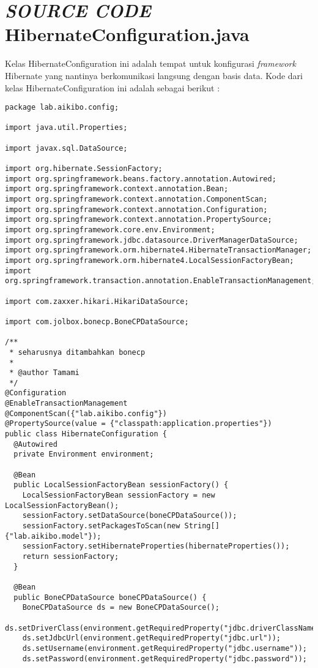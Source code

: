 \documentclass[pdftex,12pt, oneside]{article}
\begin{document}
\section{\textit{SOURCE CODE} HibernateConfiguration.java}

Kelas HibernateConfiguration ini adalah tempat untuk konfigurasi \textit{framework} Hibernate yang nantinya berkomunikasi langsung dengan basis data. Kode dari kelas HibernateConfiguration ini adalah sebagai berikut :

\begin{lstlisting}
package lab.aikibo.config;

import java.util.Properties;

import javax.sql.DataSource;

import org.hibernate.SessionFactory;
import org.springframework.beans.factory.annotation.Autowired;
import org.springframework.context.annotation.Bean;
import org.springframework.context.annotation.ComponentScan;
import org.springframework.context.annotation.Configuration;
import org.springframework.context.annotation.PropertySource;
import org.springframework.core.env.Environment;
import org.springframework.jdbc.datasource.DriverManagerDataSource;
import org.springframework.orm.hibernate4.HibernateTransactionManager;
import org.springframework.orm.hibernate4.LocalSessionFactoryBean;
import org.springframework.transaction.annotation.EnableTransactionManagement;

import com.zaxxer.hikari.HikariDataSource;

import com.jolbox.bonecp.BoneCPDataSource;

/**
 * seharusnya ditambahkan bonecp
 *
 * @author Tamami
 */
@Configuration
@EnableTransactionManagement
@ComponentScan({"lab.aikibo.config"})
@PropertySource(value = {"classpath:application.properties"})
public class HibernateConfiguration {
  @Autowired
  private Environment environment;

  @Bean
  public LocalSessionFactoryBean sessionFactory() {
    LocalSessionFactoryBean sessionFactory = new LocalSessionFactoryBean();
    sessionFactory.setDataSource(boneCPDataSource());
    sessionFactory.setPackagesToScan(new String[] {"lab.aikibo.model"});
    sessionFactory.setHibernateProperties(hibernateProperties());
    return sessionFactory;
  }

  @Bean
  public BoneCPDataSource boneCPDataSource() {
    BoneCPDataSource ds = new BoneCPDataSource();
    ds.setDriverClass(environment.getRequiredProperty("jdbc.driverClassName"));
    ds.setJdbcUrl(environment.getRequiredProperty("jdbc.url"));
    ds.setUsername(environment.getRequiredProperty("jdbc.username"));
    ds.setPassword(environment.getRequiredProperty("jdbc.password"));


\end{lstlisting}
\end{document}
